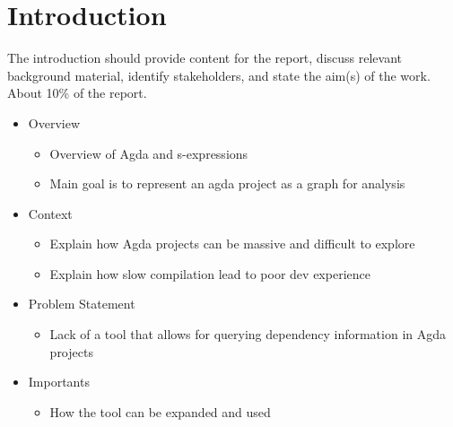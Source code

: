 
\chapter{Introduction}

The introduction should provide content for the report, discuss relevant background
material, identify stakeholders, and state the aim(s) of the work. About 10\% of
the report.

\begin{itemize} 
\item Overview
    \begin{itemize}
    \item Overview of Agda and s-expressions 
    \item Main goal is to represent an agda project as a graph for analysis 
    \end{itemize} 
\item Context
    \begin{itemize}
    \item Explain how Agda projects can be massive and difficult to explore 
    \item Explain how slow compilation lead to poor dev experience 
    \end{itemize} 
\item Problem Statement
    \begin{itemize}
    \item Lack of a tool that allows for querying dependency information in
        Agda projects 
    \end{itemize} 
\item Importants
    \begin{itemize}
    \item How the tool can be expanded and used
    \end{itemize}
\end{itemize}
